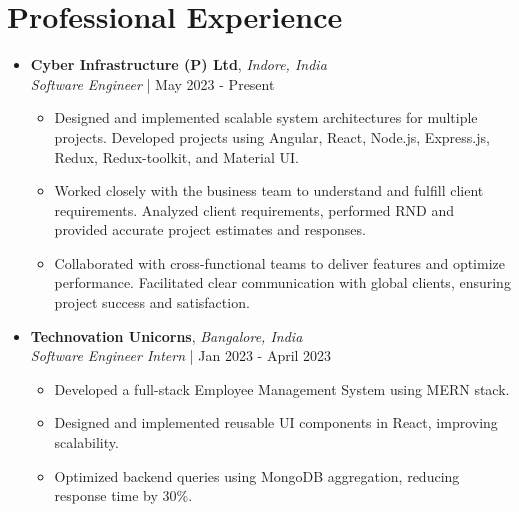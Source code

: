 \documentclass[a4paper,11pt]{article}
\newcommand{\resumeSubheading}[4]{\item \textbf{#1}, \textit{#2} \\ \textit{#3} | #4}
\begin{document}
\section{Professional Experience}
\begin{itemize}[leftmargin=10pt]
    \resumeSubheading{Cyber Infrastructure (P) Ltd}{Indore, India}
{Software Engineer}{May 2023 - Present}
    \begin{itemize}
        \item Designed and implemented scalable system architectures for multiple projects. Developed projects using Angular, React, Node.js, Express.js, Redux, Redux-toolkit, and Material UI.
        \item Worked closely with the business team to understand and fulfill client requirements. Analyzed client requirements, performed RND and provided accurate project estimates and responses.
        \item Collaborated with cross-functional teams to deliver features and optimize performance. Facilitated clear communication with global clients, ensuring project success and satisfaction.
    \end{itemize}
    
    \resumeSubheading{Technovation Unicorns}{Bangalore, India}
    {Software Engineer Intern}{Jan 2023 - April 2023}
    \begin{itemize}
        \item Developed a full-stack Employee Management System using MERN stack.
        \item Designed and implemented reusable UI components in React, improving scalability.
        \item Optimized backend queries using MongoDB aggregation, reducing response time by 30\%.
    \end{itemize}
\end{itemize}

\end{document}
